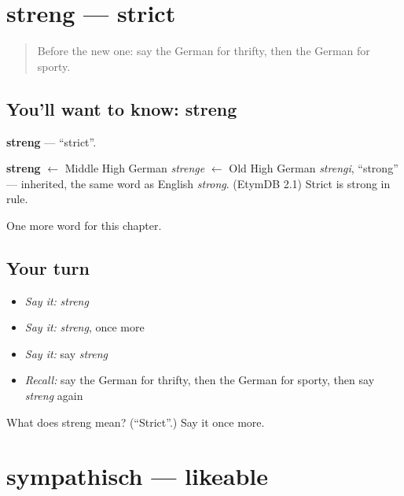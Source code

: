 \section[streng]{streng — strict}

\label{lesson:GE-C222-streng}



\begin{quote}
Before the new one: say the German for thrifty, then the German for sporty.
\end{quote}

\subsection*{You'll want to know: streng}
\textbf{streng} — \textquotedblleft{}strict\textquotedblright{}.

\begin{cousinweb}
\textbf{streng} $\leftarrow$ Middle High German \emph{strenge} $\leftarrow$ Old High German \emph{strengi}, \textquotedblleft{}strong\textquotedblright{} — inherited, the same word as English \emph{strong}. (EtymDB 2.1) Strict is strong in rule.
\end{cousinweb}

\begin{grammarlens}[title={What you've built}]
One more word for this chapter.
\end{grammarlens}

\subsection*{Your turn}
\begin{itemize}
\raggedright
  \item \emph{Say it:} \emph{streng}
  \item \emph{Say it:} \emph{streng}, once more
  \item \emph{Say it:} say \emph{streng}
  \item \emph{Recall:} say the German for thrifty, then the German for sporty, then say \emph{streng} again
\end{itemize}

\begin{tcolorbox}[breakable,colback=teal!4,colframe=teal!35!black,title={Before you move on}]
What does streng mean? (\textquotedblleft{}Strict\textquotedblright{}.) Say it once more.
\end{tcolorbox}
\section[sympathisch]{sympathisch — likeable}

